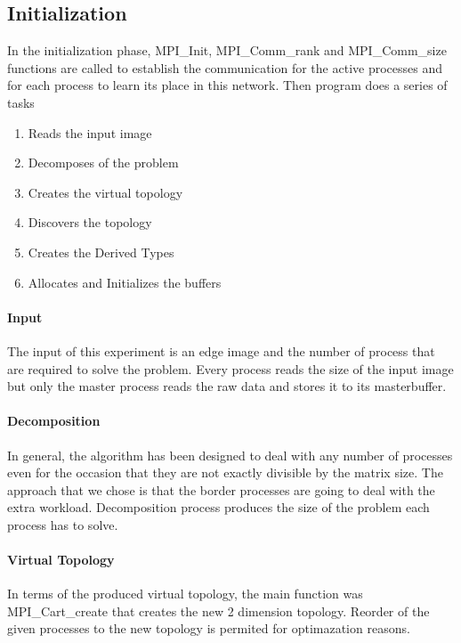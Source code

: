 \documentclass[12pt,a4paper]{article}
\begin{document}
    \subsection{Initialization}
      In the initialization phase, MPI\_Init, MPI\_Comm\_rank and MPI\_Comm\_size functions are called to establish the communication for the active processes and for each process to learn its place in this network. Then program does a series of tasks

      \begin{enumerate}
        \item Reads the input image
        \item Decomposes of the problem
        \item Creates the virtual topology
        \item Discovers the topology
        \item Creates the Derived Types
        \item Allocates and Initializes the buffers
      \end{enumerate}

      \paragraph{Input}
			   The input of this experiment is an edge image and the number of process that are required to solve the problem. Every process reads the size of the input image but only the master process reads the raw data and stores it to its masterbuffer.

      \paragraph{Decomposition}
        In general, the algorithm has been designed to deal with any number of processes even for the occasion that they are not exactly divisible by the matrix size. The approach that we chose is that the border processes are going to deal with the extra workload. Decomposition process produces the size of the problem each process has to solve.

      \paragraph{Virtual Topology}
        In terms of the produced virtual topology, the main function was MPI\_Cart\_create that creates the new 2 dimension topology. Reorder of the given processes to the new topology is permited for optimazation reasons.
\end{document}
